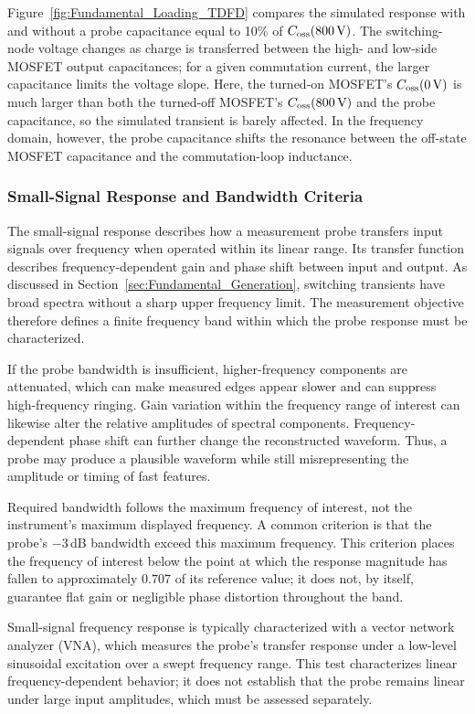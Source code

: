 Figure~\ref{fig:Fundamental_Loading_TDFD} compares the simulated response with and without a probe capacitance equal to 10\% of ${C}_{\mathrm{oss}}(\SI{800}{V})$. 
The switching-node voltage changes as charge is transferred between the high- and low-side MOSFET output capacitances; for a given commutation current, the larger capacitance limits the voltage slope. 
Here, the turned-on MOSFET's ${C}_{\mathrm{oss}}(\SI{0}{V})$ is much larger than both the turned-off MOSFET's ${C}_{\mathrm{oss}}(\SI{800}{V})$ and the probe capacitance, so the simulated transient is barely affected. 
In the frequency domain, however, the probe capacitance shifts the resonance between the off-state MOSFET capacitance and the commutation-loop inductance.

\subsubsection*{Small-Signal Response and Bandwidth Criteria}
The small-signal response describes how a measurement probe transfers input signals over frequency when operated within its linear range. 
Its transfer function describes frequency-dependent gain and phase shift between input and output.
As discussed in Section~\ref{sec:Fundamental_Generation}, switching transients have broad spectra without a sharp upper frequency limit.
The measurement objective therefore defines a finite frequency band within which the probe response must be characterized.

If the probe bandwidth is insufficient, higher-frequency components are attenuated, which can make measured edges appear slower and can suppress high-frequency ringing. 
Gain variation within the frequency range of interest can likewise alter the relative amplitudes of spectral components. 
Frequency-dependent phase shift can further change the reconstructed waveform. Thus, a probe may produce a plausible waveform while still misrepresenting the amplitude or timing of fast features.



Required bandwidth follows the maximum frequency of interest, not the instrument's maximum displayed frequency.
A common criterion is that the probe's $-3$\,dB bandwidth exceed this maximum frequency. 
This criterion places the frequency of interest below the point at which the response magnitude has fallen to approximately $0.707$ of its reference value; it does not, by itself, guarantee flat gain or negligible phase distortion throughout the band. 

Small-signal frequency response is typically characterized with a vector network analyzer (VNA), which measures the probe's transfer response under a low-level sinusoidal excitation over a swept frequency range. 
This test characterizes linear frequency-dependent behavior; it does not establish that the probe remains linear under large input amplitudes, which must be assessed separately.

